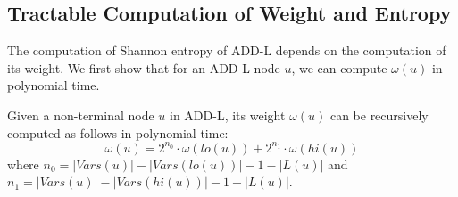 \subsection{Tractable Computation of Weight and Entropy}
	
	The computation of Shannon entropy of ADD-L depends on the computation of its weight. 
    We first show that for an ADD-L node $u$, we can compute $\omega(u)$ in polynomial time.
	\begin{proposition}\label{prop:omega-proposition}
		Given a non-terminal node $u$ in ADD-L, its weight $\mathit{\omega}(u)$ can be recursively computed as follows in polynomial time:
		$$\mathit{\omega}(u) = 2^{n_0} \cdot \mathit{\omega}(lo(u)) + 2^{n_1} \cdot \mathit{\omega}(hi(u))$$
		where $n_0 = |\mathit{Vars}(u)| - |\mathit{Vars}(lo(u))|-1 - |L(u)|$ and $n_1 = |\mathit{Vars}(u)| - |\mathit{Vars}(hi(u))|-1 - |L(u)|$. 
		

\end{proposition}
